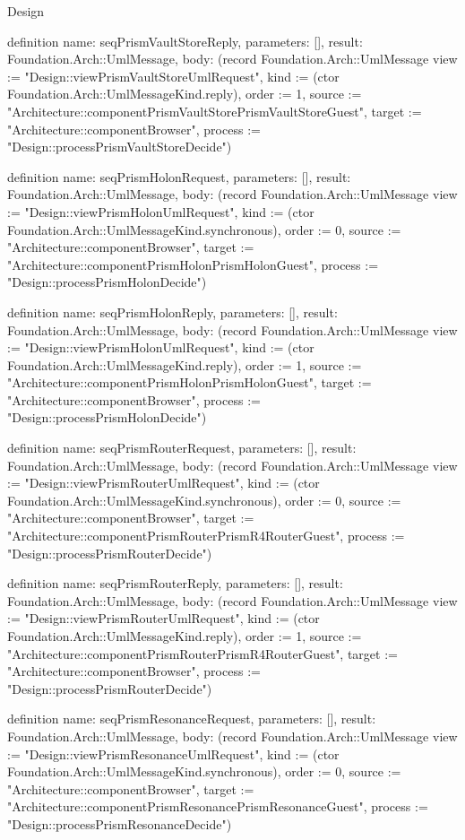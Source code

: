 \begin{lexlean}{Design}
\begin{semanticmodule}
definition{
  name: seqPrismVaultStoreReply,
  parameters: [],
  result: Foundation.Arch::UmlMessage,
  body: (record Foundation.Arch::UmlMessage {view := "Design::viewPrismVaultStoreUmlRequest", kind := (ctor Foundation.Arch::UmlMessageKind.reply), order := 1, source := "Architecture::componentPrismVaultStorePrismVaultStoreGuest", target := "Architecture::componentBrowser", process := "Design::processPrismVaultStoreDecide"})
}

definition{
  name: seqPrismHolonRequest,
  parameters: [],
  result: Foundation.Arch::UmlMessage,
  body: (record Foundation.Arch::UmlMessage {view := "Design::viewPrismHolonUmlRequest", kind := (ctor Foundation.Arch::UmlMessageKind.synchronous), order := 0, source := "Architecture::componentBrowser", target := "Architecture::componentPrismHolonPrismHolonGuest", process := "Design::processPrismHolonDecide"})
}

definition{
  name: seqPrismHolonReply,
  parameters: [],
  result: Foundation.Arch::UmlMessage,
  body: (record Foundation.Arch::UmlMessage {view := "Design::viewPrismHolonUmlRequest", kind := (ctor Foundation.Arch::UmlMessageKind.reply), order := 1, source := "Architecture::componentPrismHolonPrismHolonGuest", target := "Architecture::componentBrowser", process := "Design::processPrismHolonDecide"})
}

definition{
  name: seqPrismRouterRequest,
  parameters: [],
  result: Foundation.Arch::UmlMessage,
  body: (record Foundation.Arch::UmlMessage {view := "Design::viewPrismRouterUmlRequest", kind := (ctor Foundation.Arch::UmlMessageKind.synchronous), order := 0, source := "Architecture::componentBrowser", target := "Architecture::componentPrismRouterPrismR4RouterGuest", process := "Design::processPrismRouterDecide"})
}

definition{
  name: seqPrismRouterReply,
  parameters: [],
  result: Foundation.Arch::UmlMessage,
  body: (record Foundation.Arch::UmlMessage {view := "Design::viewPrismRouterUmlRequest", kind := (ctor Foundation.Arch::UmlMessageKind.reply), order := 1, source := "Architecture::componentPrismRouterPrismR4RouterGuest", target := "Architecture::componentBrowser", process := "Design::processPrismRouterDecide"})
}

definition{
  name: seqPrismResonanceRequest,
  parameters: [],
  result: Foundation.Arch::UmlMessage,
  body: (record Foundation.Arch::UmlMessage {view := "Design::viewPrismResonanceUmlRequest", kind := (ctor Foundation.Arch::UmlMessageKind.synchronous), order := 0, source := "Architecture::componentBrowser", target := "Architecture::componentPrismResonancePrismResonanceGuest", process := "Design::processPrismResonanceDecide"})
}


\end{semanticmodule}
\end{lexlean}
